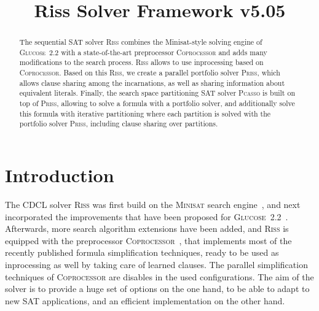 \documentclass[conference]{IEEEtran}
\begin{document}
	
\title{Riss Solver Framework v5.05}

\author{
}

\maketitle

\def\coprocessor{\textsc{Coprocessor}\xspace}
\def\glucose{\textsc{Glucose~2.2}\xspace}
\def\minisat{\textsc{Minisat~2.2}\xspace}
\def\riss{\textsc{Riss}\xspace}
\def\priss{\textsc{Priss}\xspace}
\def\pcasso{\textsc{Pcasso}\xspace}

\begin{abstract}
The sequential SAT solver \riss combines the Minisat-style solving engine of \glucose with a state-of-the-art preprocessor \textsc{Coprocessor} and adds many modifications to the search process. 
\riss allows to use inprocessing based on \coprocessor.
Based on this \riss, we create a parallel portfolio solver \priss, which allows clause sharing among the incarnations, as well as sharing information about equivalent literals. 
Finally, the search space partitioning SAT solver \pcasso is built on top of \priss, allowing to solve a formula with a portfolio solver, and additionally solve this formula with iterative partitioning where each partition is solved with the portfolio solver \priss, including clause sharing over partitions. 
\end{abstract}

\section{Introduction}

The CDCL solver \riss was first build on the \textsc{Minisat} search engine~\cite{EenS:2003}, and next incorporated the improvements that have been proposed for \glucose ~\cite{AudemardS:2009,Audemard:2012:RRS:2405292.2405308}. 
Afterwards, more search algorithm extensions have been added, and \riss is equipped with the preprocessor \textsc{Coprocessor}~\cite{Manthey:2012}, 
that implements most of the recently published formula simplification techniques, ready to be used as inprocessing as well by taking care of learned clauses. 
The parallel simplification techniques of \coprocessor are disables in the used configurations. 
The aim of the solver is to provide a huge set of options on the one hand, to be able to adapt to new SAT applications, and an efficient implementation on the other hand. 
\end{document}
